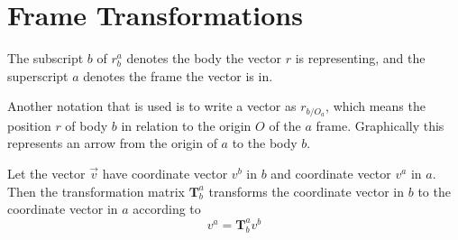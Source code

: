 \section{Frame Transformations}
The subscript $b$ of $r_b^a$ denotes the body the vector $r$ is representing, and the superscript $a$ denotes the frame the vector is in. 

Another notation that is used is to write a vector as $r_{b/O_a}$, which means the position $r$ of body $b$ in relation to the origin $O$ of the $a$ frame. Graphically this represents an arrow from the origin of $a$ to the body $b$.

Let the vector $\vec{v}$ have coordinate vector $v^b$ in $b$ and coordinate vector $v^a$ in $a$. Then the transformation matrix $\mathbf T_b^a$ transforms the coordinate vector in $b$ to the coordinate vector in $a$ according to
$$
v^a=\mathbf T_b^a v^b
$$
